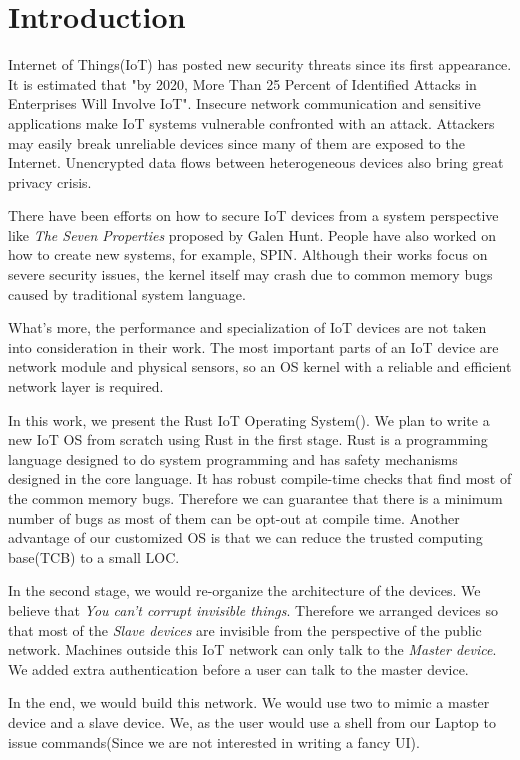 \section{Introduction}

Internet of Things(IoT) has posted new security threats since its first appearance. 
It is estimated that "by 2020, More Than 25 Percent of Identified Attacks in Enterprises Will Involve IoT"\cite{gartner2016gartner}. 
Insecure network communication and sensitive applications make IoT systems vulnerable confronted with an attack. 
Attackers may easily break unreliable devices since many of them are exposed to the Internet\cite{kolias2017ddos}. 
Unencrypted data flows between heterogeneous devices also bring great privacy crisis\cite{khan2018iot}.

There have been efforts on how to secure IoT devices from a system perspective like \textit{The Seven Properties}\cite{hunt2017the} proposed by Galen Hunt. 
People have also worked on how to create new systems, for example, SPIN\cite{hesselman2017spin}. 
Although their works focus on severe security issues, the kernel itself may crash due to common memory bugs caused by traditional system language.

What's more, the performance and specialization of IoT devices are not taken into consideration in their work. 
The most important parts of an IoT device are network module and physical sensors, so an OS kernel with a reliable and efficient network layer is required.

In this work, we present the Rust IoT Operating System(\ritos).
We plan to write a new IoT OS from scratch using Rust in the first stage.
Rust is a programming language designed to do system programming and has safety mechanisms designed in the core language.
It has robust compile-time checks that find most of the common memory bugs.
Therefore we can guarantee that there is a minimum number of bugs as most of them can be opt-out at compile time. 
Another advantage of our customized OS is that we can reduce the trusted computing base(TCB) to a small LOC.

In the second stage, we would re-organize the architecture of the devices.
We believe that \textit{You can't corrupt invisible things}.
Therefore we arranged devices so that most of the \textit{Slave devices} are invisible from the perspective of the public network.
Machines outside this IoT network can only talk to the \textit{Master device}.
We added extra authentication before a user can talk to the master device.

In the end, we would build this network. 
We would use two \rpi to mimic a master device and a slave device. 
We, as the user would use a shell from our Laptop to issue commands(Since we are not interested in writing a fancy UI).